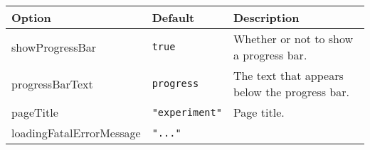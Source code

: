 \documentclass[
]{article}
\begin{document}
\begin{RaggedRight}\small\begin{longtable}[]{p{1.7in}p{1in}p{3.15in}}
\toprule
\begin{minipage}[b]{0.26\columnwidth}\raggedright
\textbf{Option}\strut
\end{minipage} & \begin{minipage}[b]{0.28\columnwidth}\raggedright
\textbf{Default}\strut
\end{minipage} & \begin{minipage}[b]{0.37\columnwidth}\raggedright
\textbf{Description}\strut
\end{minipage}\tabularnewline
\midrule
\endhead
\begin{minipage}[t]{0.26\columnwidth}\raggedright
showProgressBar\strut
\end{minipage} & \begin{minipage}[t]{0.28\columnwidth}\raggedright
\texttt{true}\strut
\end{minipage} & \begin{minipage}[t]{0.37\columnwidth}\raggedright
Whether or not to show a progress bar.\strut
\end{minipage}\tabularnewline
\begin{minipage}[t]{0.26\columnwidth}\raggedright
progressBarText\strut
\end{minipage} & \begin{minipage}[t]{0.28\columnwidth}\raggedright
\texttt{progress}\strut
\end{minipage} & \begin{minipage}[t]{0.37\columnwidth}\raggedright
The text that appears below the progress bar.\strut
\end{minipage}\tabularnewline
\begin{minipage}[t]{0.26\columnwidth}\raggedright
pageTitle\strut
\end{minipage} & \begin{minipage}[t]{0.28\columnwidth}\raggedright
\texttt{"experiment"}\strut
\end{minipage} & \begin{minipage}[t]{0.37\columnwidth}\raggedright
Page title.\strut
\end{minipage}\tabularnewline
\begin{minipage}[t]{0.26\columnwidth}\raggedright
loadingFatalErrorMessage\strut
\end{minipage} & \begin{minipage}[t]{0.28\columnwidth}\raggedright
\texttt{"..."}\strut

\end{minipage}
\end{longtable}
\end{RaggedRight}
\end{document}
